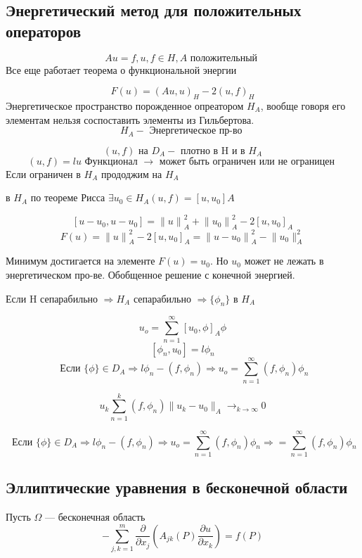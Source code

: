\documentclass[12pt, a4paper]{article}
\begin{document}
\subsection{Энергетический метод для положительных операторов}

\[ Au = f, u, f \in H, A \textrm{ положительный } \]
Все еще работает теорема о функциональной энергии

\[ F(u) = (Au, u)_H - 2(u, f)_H \label{8_2_2}\]
Энергетическое пространство порожденное опреатором $ H_A $, вообще говоря его элементам нельзя соспоставить элементы из Гильбертова.
\[ H_A - \textrm{  Энергетическое пр-во } \]

\[ (u, f) \textrm{ на  } D_A - \textrm{ плотно в H и в } H_A  \]
\[ (u,f) = lu \textrm{ Функционал } \rightarrow \textrm{ может быть ограничен или не ограницен } \]
Если ограничен в $H_A$ прододжим на $H_A$

в $ H_A $ по теореме Рисса $ \exists u_0 \in H_A (u, f) = [u, u_0]A $

\[ [u - u_0, u-u_0] = {\|u\|}^2_A + {\|u_0\|}^2_A - 2{[u, u_0]}_A \]
\[ F(u) = {\| u \|}^2_A - 2[u, u_0]_A = {\|u-u_0\|}^2_A - {\|u_0\|^2_A} \label{8_2_4} \]

Минимум достигается на элементе $F(u) = u_0$. Но $ u_0 $ может не лежать в энергетическом про-ве. Обобщенное решение с конечной энергией.

Если H сепарабильно $ \Rightarrow H_A $ сепарабильно $ \Rightarrow \{ \phi_n \} $ в $ H_A $

\[ u_o = \sum_{n=1}^{\infty}{[u_0, \phi]}_A \phi\]
\[ [\phi_n, u_0] = l\phi_n \]
\[\textrm{ Если } \{\phi \} \in D_A \Rightarrow l \phi_n - (f, \phi_n) \Rightarrow u_o = \sum_{n=1}^{\infty} (f, \phi_n) \phi_n  \]

\[ u_k \sum_{n=1}^{k} (f, \phi_n) \|u_k - u_0\|_{A} \rightarrow_{k \rightarrow \infty} 0 \]

\[\textrm{ Если } \{\phi \} \in D_A \Rightarrow l \phi_n - (f, \phi_n) \Rightarrow u_o = \sum_{n=1}^{\infty} (f, \phi_n) \phi_n \Rightarrow = \sum_{n=1}^{\infty} (f, \phi_n) \phi_n \]

\subsection{Эллиптические уравнения в бесконечной области}

Пусть $\Omega$ --- бесконечная область
\[ -\sum_{j,k=1}^{m} \frac{\partial }{\partial x_j} \left(A_{jk} (P)\frac{\partial u}{\partial x_k}\right) = f(P) \]
\end{document}
